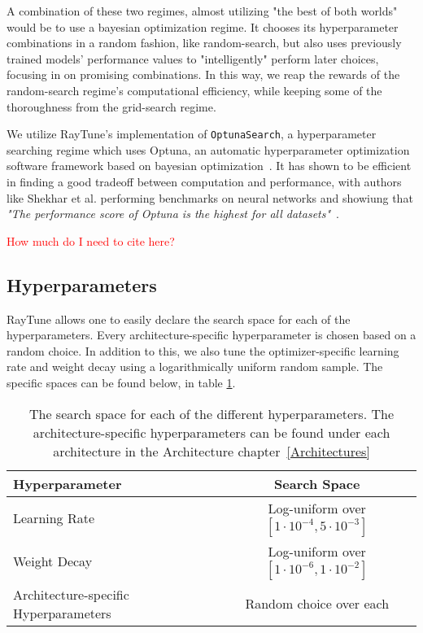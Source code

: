 A combination of these two regimes, almost utilizing "the best of both worlds" would be to use a bayesian optimization regime. It chooses its hyperparameter combinations in a random fashion, like random-search, but also uses previously trained models' performance values to "intelligently" perform later choices, focusing in on promising combinations. In this way, we reap the rewards of the random-search regime's computational efficiency, while keeping some of the thoroughness from the grid-search regime.

We utilize RayTune's implementation of \texttt{OptunaSearch}, a hyperparameter searching regime which uses Optuna, an automatic hyperparameter optimization software framework based on bayesian optimization~\cite{akiba2019optuna}. It has shown to be efficient in finding a good tradeoff between computation and performance, with authors like Shekhar et al. performing benchmarks on neural networks and showiung that \textit{"The performance score of Optuna is the highest for all datasets"}~\cite{shekhar2021comparative}.

\textcolor{red}{How much do I need to cite here?}

\subsection{Hyperparameters}

RayTune allows one to easily declare the search space for each of the hyperparameters. Every architecture-specific hyperparameter is chosen based on a random choice. In addition to this, we also tune the optimizer-specific learning rate and weight decay using a logarithmically uniform random sample. The specific spaces can be found below, in table \ref{MethodHyperparams}.

\begin{table}[H]
    \centering
    \begin{tabular}{l|c}
        Hyperparameter & Search Space       \\
        \hline
        Learning Rate      & Log-uniform over $[1\cdot{10}^{-4}, 5\cdot{10}^{-3}]$ \\
        Weight Decay     & Log-uniform over $[1\cdot{10}^{-6}, 1\cdot{10}^{-2}]$ \\
        Architecture-specific Hyperparameters      & Random choice over each \\
    \end{tabular}
    \caption{The search space for each of the different hyperparameters. The architecture-specific hyperparameters can be found under each architecture in the Architecture chapter~\ref{Architectures}}
    \label{MethodHyperparams}
\end{table}